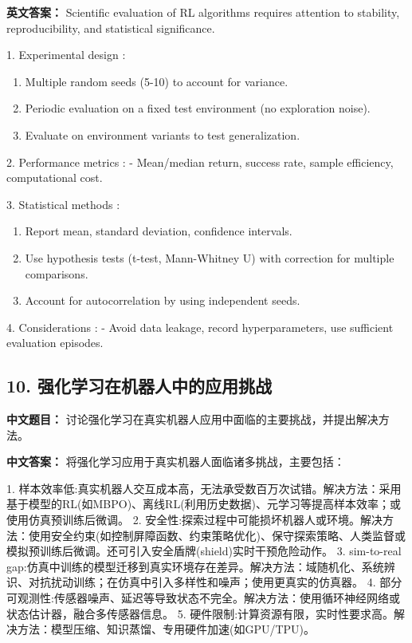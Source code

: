 \documentclass[10pt,a4paper]{ctexart}
\begin{document}
\textbf{英文答案：}  
Scientific evaluation of RL algorithms requires attention to stability, reproducibility, and statistical significance.

1.  Experimental design :
\begin{enumerate}
       \item Multiple random seeds (5-10) to account for variance.
       \item Periodic evaluation on a fixed test environment (no exploration noise).
       \item Evaluate on environment variants to test generalization.
\end{enumerate}

2.  Performance metrics :
   - Mean/median return, success rate, sample efficiency, computational cost.

3.  Statistical methods :
\begin{enumerate}
       \item Report mean, standard deviation, confidence intervals.
       \item Use hypothesis tests (t-test, Mann-Whitney U) with correction for multiple comparisons.
       \item Account for autocorrelation by using independent seeds.
\end{enumerate}

4.  Considerations :
   - Avoid data leakage, record hyperparameters, use sufficient evaluation episodes.

\subsection*{10. 强化学习在机器人中的应用挑战}
\textbf{中文题目：} 讨论强化学习在真实机器人应用中面临的主要挑战，并提出解决方法。

\textbf{中文答案：}  
将强化学习应用于真实机器人面临诸多挑战，主要包括：

1.  样本效率低:真实机器人交互成本高，无法承受数百万次试错。解决方法：采用基于模型的RL(如MBPO)、离线RL(利用历史数据)、元学习等提高样本效率；或使用仿真预训练后微调。
2.  安全性:探索过程中可能损坏机器人或环境。解决方法：使用安全约束(如控制屏障函数、约束策略优化)、保守探索策略、人类监督或模拟预训练后微调。还可引入安全盾牌(shield)实时干预危险动作。
3.  sim-to-real gap:仿真中训练的模型迁移到真实环境存在差异。解决方法：域随机化、系统辨识、对抗扰动训练；在仿真中引入多样性和噪声；使用更真实的仿真器。
4.  部分可观测性:传感器噪声、延迟等导致状态不完全。解决方法：使用循环神经网络或状态估计器，融合多传感器信息。
5.  硬件限制:计算资源有限，实时性要求高。解决方法：模型压缩、知识蒸馏、专用硬件加速(如GPU/TPU)。
\end{document}
